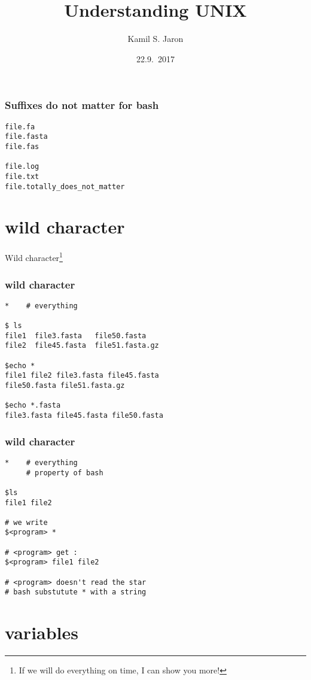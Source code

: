 \documentclass[xcolor=dvipsnames]{beamer}
\title[ ]{Understanding UNIX}
\author{Kamil S. Jaron}
\date{22.9.~2017}
\begin{document}
\begin{frame}
	\titlepage
\end{frame}

\begin{frame}[fragile]
\frametitle{Suffixes do not matter for bash}
\large
\begin{verbatim}
file.fa
file.fasta
file.fas

file.log
file.txt
file.totally_does_not_matter
\end{verbatim}
\end{frame}

\section{wild character}

\begin{frame}
	\begin{center}
		\huge
		Wild character\footnote{If we will do everything on time, I can show you more!} \\
	\end{center}
\end{frame}

\begin{frame}[fragile]
\frametitle{wild character}
\large
\begin{verbatim}
*    # everything

$ ls
file1  file3.fasta   file50.fasta
file2  file45.fasta  file51.fasta.gz

$echo *
file1 file2 file3.fasta file45.fasta
file50.fasta file51.fasta.gz

$echo *.fasta
file3.fasta file45.fasta file50.fasta
\end{verbatim}
\end{frame}

\begin{frame}[fragile]
\frametitle{wild character}
\large
\begin{verbatim}
*    # everything
     # property of bash

$ls
file1 file2

# we write
$<program> *

# <program> get :
$<program> file1 file2

# <program> doesn't read the star
# bash substutute * with a string
\end{verbatim}
\end{frame}

\section{variables}
\end{document}
